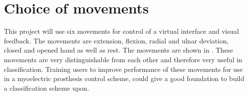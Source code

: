 \section{Choice of movements} \label{sec:BG:anatomy}


This project will use six movements for control of a virtual interface and visual feedback. The movements are extension, flexion, radial and ulnar deviation, closed and opened hand as well as rest. The movements are shown in . %
These movements are very distinguishable from each other and therefore very useful in classification. %
Training users to improve performance of these movements for use in a myoelectric prosthesis control scheme, could give a good foundation to build a classification scheme upon. %


